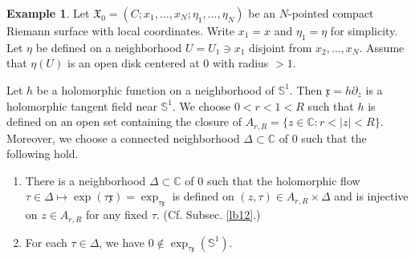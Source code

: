 \documentclass[12pt,a4paper,notitlepage]{article}
\theoremstyle{definition}
\newtheorem{eg}[df]{Example}
\theoremstyle{plain}
\newcommand{\fk}{\mathfrak}
\newcommand{\xk}{\mathfrak x}
\newcommand{\Cbb}{\mathbb C}
\newcommand{\Sbb}{{\mathbb S}}
\numberwithin{equation}{section}
\begin{document}
\begin{eg}\label{lb109}
Let $\fk X_0=(C;x_1,\dots,x_N;\eta_1,\dots,\eta_N)$ be an $N$-pointed compact Riemann surface with local coordinates. Write $x_1=x$ and $\eta_1=\eta$ for simplicity. Let $\eta$ be defined on a neighborhood $U=U_1\ni x_1$ disjoint from $x_2,\dots,x_N$. Assume that $\eta(U)$ is an open  disk centered at $0$ with radius $>1$.


Let $h$ be a holomorphic function on a neighborhood of $\Sbb^1$. Then $\xk=h\partial_z$ is a holomorphic tangent field near $\Sbb^1$. We choose $0<r<1<R$ such that $h$ is defined on an open set containing the closure of $A_{r,R}=\{z\in\Cbb:r<|z|<R\}$.  Moreover, we choose a connected neighborhood $\Delta\subset\Cbb$ of $0$ such that the following hold.
\begin{enumerate}
\item There is a neighborhood $\Delta\subset\Cbb$ of $0$ such that the holomorphic flow  $\tau\in\Delta\mapsto\exp(\tau \xk)=\exp_{\tau\xk}$ is defined on $(z,\tau)\in A_{r,R}\times\Delta$ and is injective on $z\in A_{r,R}$ for any fixed $\tau$.  (Cf. Subsec. \ref{lb12}.)
\item For each $\tau\in\Delta$, we have $0\notin\exp_{\tau\xk}(\Sbb^1)$.
\end{enumerate}


\end{eg}
\end{document}
